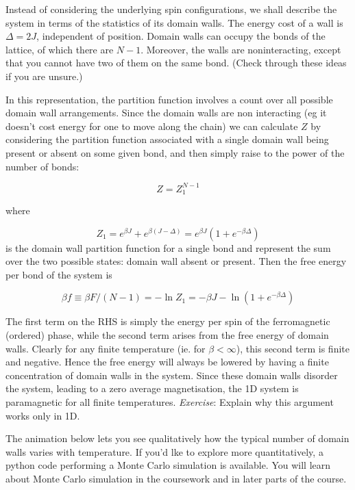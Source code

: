 \documentclass[
  letterpaper,
  enabledeprecatedfontcommands]{report}
\begin{document}
Instead of considering the underlying spin configurations, we shall
describe the system in terms of the statistics of its domain walls. The
energy cost of a wall is \(\Delta = 2J\), independent of position.
Domain walls can occupy the bonds of the lattice, of which there are
\(N-1\). Moreover, the walls are noninteracting, except that you cannot
have two of them on the same bond. (Check through these ideas if you are
unsure.)

In this representation, the partition function involves a count over all
possible domain wall arrangements. Since the domain walls are non
interacting (eg it doesn't cost energy for one to move along the chain)
we can calculate \(Z\) by considering the partition function associated
with a single domain wall being present or absent on some given bond,
and then simply raise to the power of the number of bonds:

\[Z=Z_1^{N-1}\]

where

\[Z_1=e^{\beta J} + e^{\beta (J-\Delta)}=e^{\beta J}(1+e^{-\beta\Delta})\]
is the domain wall partition function for a single bond and represent
the sum over the two possible states: domain wall absent or present.
Then the free energy per bond of the system is

\[\beta f\equiv \beta F/(N-1)=-\ln Z_1=-\beta J-\ln(1+e^{-\beta\Delta})\]

The first term on the RHS is simply the energy per spin of the
ferromagnetic (ordered) phase, while the second term arises from the
free energy of domain walls. Clearly for any finite temperature (ie. for
\(\beta<\infty\)), this second term is finite and negative. Hence the
free energy will always be lowered by having a finite concentration of
domain walls in the system. Since these domain walls disorder the
system, leading to a zero average magnetisation, the 1D system is
paramagnetic for all finite temperatures. \emph{Exercise}: Explain why
this argument works only in 1D.

The animation below lets you see qualitatively how the typical number of
domain walls varies with temperature. If you'd lke to explore more
quantitatively, a python code performing a Monte Carlo simulation is
available. You will learn about Monte Carlo simulation in the coursework
and in later parts of the course.
\end{document}
